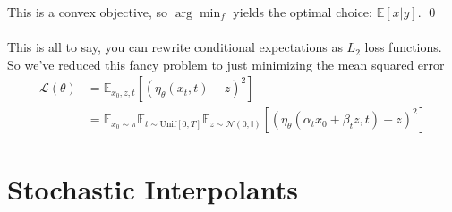 This is a convex objective, so $\arg \min_f$ yields the optimal choice: $\mathbb E[x|y]$. \qed
\\
\\
This is all to say, you can rewrite conditional expectations as $L_2$ loss functions. So we've reduced this fancy problem to just minimizing the mean squared error
\begin{align}
	\mathcal L(\theta) & = \mathbb E_{x_0, z, t}[ (\eta_\theta(x_t,t) - z)^2] \\
	& = \mathbb E_{x_0 \sim \pi}\mathbb E_{t \sim \text{Unif}[0,T]} \mathbb E_{z \sim \mathcal N(0, \mathbb I)} [(\eta_\theta(\alpha_t x_0 + \beta_t z, t) - z)^2]
\end{align}




\section{Stochastic Interpolants}
